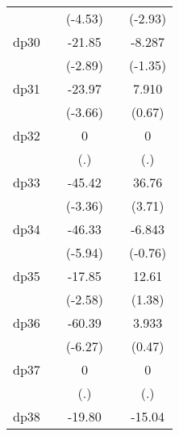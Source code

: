 {\begin{tabular}{l*{4}{c}}
            &                     &     (-4.53)         &                     &     (-2.93)         \\
[1em]
dp30        &                     &      -21.85\sym{**} &                     &      -8.287         \\
            &                     &     (-2.89)         &                     &     (-1.35)         \\
[1em]
dp31        &                     &      -23.97\sym{***}&                     &       7.910         \\
            &                     &     (-3.66)         &                     &      (0.67)         \\
[1em]
dp32        &                     &           0         &                     &           0         \\
            &                     &         (.)         &                     &         (.)         \\
[1em]
dp33        &                     &      -45.42\sym{***}&                     &       36.76\sym{***}\\
            &                     &     (-3.36)         &                     &      (3.71)         \\
[1em]
dp34        &                     &      -46.33\sym{***}&                     &      -6.843         \\
            &                     &     (-5.94)         &                     &     (-0.76)         \\
[1em]
dp35        &                     &      -17.85\sym{*}  &                     &       12.61         \\
            &                     &     (-2.58)         &                     &      (1.38)         \\
[1em]
dp36        &                     &      -60.39\sym{***}&                     &       3.933         \\
            &                     &     (-6.27)         &                     &      (0.47)         \\
[1em]
dp37        &                     &           0         &                     &           0         \\
            &                     &         (.)         &                     &         (.)         \\
[1em]
dp38        &                     &      -19.80\sym{***}&                     &      -15.04\sym{***}\\

\end{tabular}}
